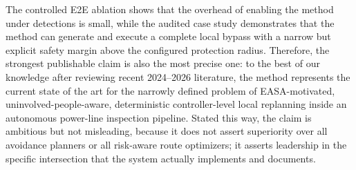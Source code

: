 \documentclass[a4paper,11pt]{article}
\begin{document}
The controlled E2E ablation shows that the overhead of enabling the method under detections is small, while the audited case study demonstrates that the method can generate and execute a complete local bypass with a narrow but explicit safety margin above the configured protection radius. Therefore, the strongest publishable claim is also the most precise one: to the best of our knowledge after reviewing recent 2024--2026 literature, the method represents the current state of the art for the narrowly defined problem of EASA-motivated, uninvolved-people-aware, deterministic controller-level local replanning inside an autonomous power-line inspection pipeline. Stated this way, the claim is ambitious but not misleading, because it does not assert superiority over all avoidance planners or all risk-aware route optimizers; it asserts leadership in the specific intersection that the system actually implements and documents.



\end{document}
